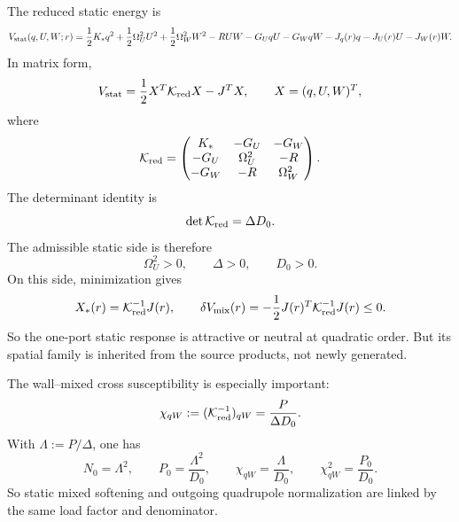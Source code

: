 The reduced static energy is
\begin{equation}
\label{eq:part07-static-energy}
V_{\rm stat}(q,U,W;r)
=
\frac12K_*q^2+\frac12\Omega_U^2U^2+\frac12\Omega_W^2W^2
-RUW-G_UqU-G_WqW-J_q(r)q-J_U(r)U-J_W(r)W.
\end{equation}
In matrix form,
\begin{equation}
\label{eq:part07-static-kred}
V_{\rm stat}=\frac12X^T\mathcal K_{\rm red}X-J^TX,
\qquad
X=(q,U,W)^T,
\end{equation}
where
\begin{equation}
\label{eq:part07-static-kred-matrix}
\mathcal K_{\rm red}
=
\begin{pmatrix}
K_* & -G_U & -G_W \\
-G_U & \Omega_U^2 & -R \\
-G_W & -R & \Omega_W^2
\end{pmatrix}.
\end{equation}
The determinant identity is
\begin{equation}
\label{eq:part07-static-det}
\det\mathcal K_{\rm red}=\Delta D_0.
\end{equation}
The admissible static side is therefore
\begin{equation}
\label{eq:part07-static-admissible}
\Omega_U^2>0,
\qquad
\Delta>0,
\qquad
D_0>0.
\end{equation}
On this side, minimization gives
\begin{equation}
\label{eq:part07-static-onshell}
X_*(r)=\mathcal K_{\rm red}^{-1}J(r),
\qquad
\delta V_{\rm mix}(r)=-\frac12J(r)^T\mathcal K_{\rm red}^{-1}J(r)\le0.
\end{equation}
So the one-port static response is attractive or neutral at quadratic order.  But its spatial family is inherited from the source products, not newly generated.

The wall--mixed cross susceptibility is especially important:
\begin{equation}
\label{eq:part07-static-chi-qw}
\chi_{qW}:=(\mathcal K_{\rm red}^{-1})_{qW}
=
\frac{P}{\Delta D_0}.
\end{equation}
With \(\Lambda:=P/\Delta\), one has
\begin{equation}
\label{eq:part07-static-load-identities}
N_0=\Lambda^2,
\qquad
P_0=\frac{\Lambda^2}{D_0},
\qquad
\chi_{qW}=\frac{\Lambda}{D_0},
\qquad
\chi_{qW}^2=\frac{P_0}{D_0}.
\end{equation}
So static mixed softening and outgoing quadrupole normalization are linked by the same load factor and denominator.

